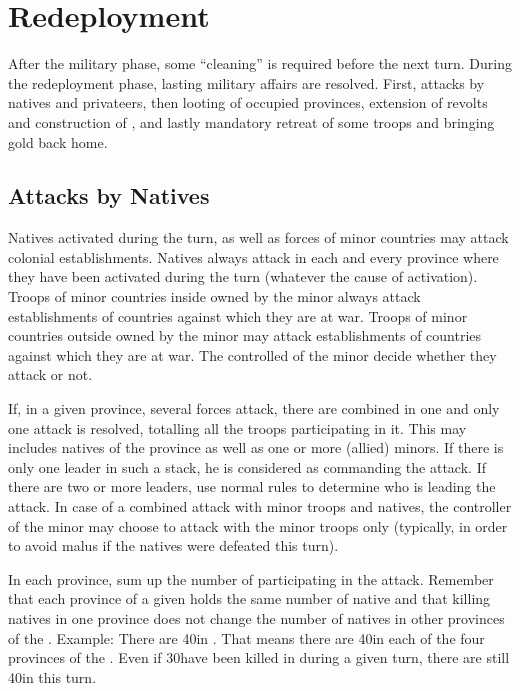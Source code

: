 \chapter{Redeployment}\label{chapter:Redep}

After the military phase, some ``cleaning'' is required before the next
turn. During the redeployment phase, lasting military affairs are
resolved. First, attacks by natives and privateers, then looting of occupied
provinces, extension of revolts and construction of \Presidios, and lastly
mandatory retreat of some troops and bringing gold back home.

\RedepPhase

\section{Attacks by Natives}\label{chRedep:Native Attack}

\aparag Natives activated during the turn, as well as forces of \ROTW minor
countries may attack colonial establishments.
\bparag Natives always attack in each and every province where they have been
activated during the turn (whatever the cause of activation).
\bparag Troops of \ROTW minor countries inside \Areas owned by the minor
always attack establishments of countries against which they are at war.
\bparag Troops of \ROTW minor countries outside \Areas owned by the minor may
attack establishments of countries against which they are at war. The
controlled of the minor decide whether they attack or not.

\bparag If, in a given province, several forces attack, there are combined in
one and only one attack is resolved, totalling all the troops participating in
it.
\bparag This may includes natives of the province as well as one or more
(allied) \ROTW minors.
\bparag If there is only one leader in such a stack, he is considered as
commanding the attack. If there are two or more leaders, use normal rules to
determine who is leading the attack.
\bparag In case of a combined attack with minor troops and natives, the
controller of the minor may choose to attack with the minor troops only
(typically, in order to avoid malus if the natives were defeated this turn).

\bparag In each province, sum up the number of \LD participating in the
attack.
\bparag Remember that each province of a given \Area holds the same number of
native \LD and that killing natives in one province does not change the number
of natives in other provinces of the \Area.
\bparag Example: There are 40\LD in \granderegionJapon. That means there are
40\LD in each of the four provinces of the \Area. Even if 30\LD have been
killed in \provinceEdo during a given turn, there are still 40\LD in
\provinceKyoto this turn.

